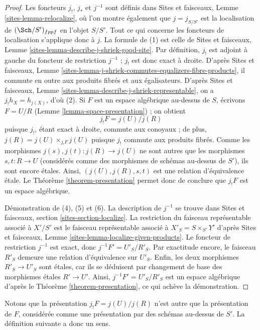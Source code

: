 \begin{proof}
Les foncteurs $j_!$, $j_*$ et $j^{-1}$ sont définis dans
Sites et faisceaux, Lemme \ref{sites-lemma-relocalize},
où l'on montre également que $j = j_{S/S'}$ est la localisation
de $(\Sch/S')_{fppf}$ en l'objet $S/S'$. Tout ce qui concerne
les foncteurs de localisation s'applique donc à $j$.
La formule de (1) est celle de
Sites et faisceaux, Lemme \ref{sites-lemma-describe-j-shriek-good-site}.
Par définition, $j_!$ est adjoint à gauche du foncteur de restriction $j^{-1}$ ;
$j_!$ est donc exact à droite. D'après
Sites et faisceaux, Lemme \ref{sites-lemma-j-shriek-commutes-equalizers-fibre-products},
il commute en outre aux produits fibrés et aux égalisateurs.
D'après
Sites et faisceaux, Lemme \ref{sites-lemma-describe-j-shriek-representable},
on a $j_!h_X = h_{j(X)}$, d'où (2).
Si $F$ est un espace algébrique au-dessus de $S$, écrivons $F = U/R$
(Lemme \ref{lemma-space-presentation}) ;
on obtient
$$
j_!F = j(U)/j(R)
$$
puisque $j_!$, étant exact à droite, commute aux conoyaux ; de plus,
$j(R) = j(U) \times_{j_!F} j(U)$ puisque $j_!$ commute aux produits fibrés.
Comme les morphismes $j(s), j(t) : j(R) \to j(U)$ ne sont autres que les morphismes
$s, t : R \to U$ (considérés comme des morphismes de schémas au-dessus de $S'$), ils
sont encore \'etales. Ainsi, $(j(U), j(R), s, t)$ est une relation d'équivalence \'etale.
Le
Théorème \ref{theorem-presentation}
permet donc de conclure que $j_!F$ est un espace algébrique.

\medskip\noindent
Démonstration de (4), (5) et (6). La description de $j^{-1}$ se trouve dans
Sites et faisceaux, section \ref{sites-section-localize}.
La restriction du faisceau représentable associé à $X'/S'$
est le faisceau représentable associé à
$X'_S = S \times_{S'} Y'$ d'après
Sites et faisceaux, Lemme \ref{sites-lemma-localize-given-products}.
Le foncteur de restriction $j^{-1}$ est exact, donc $j^{-1}F' = U'_S/R'_S$.
Par exactitude encore, le faisceau $R'_S$ demeure une relation d'équivalence sur
$U'_S$. Enfin, les deux morphismes $R'_S \to U'_S$ sont \'etales, car ils se
déduisent par changement de base des morphismes \'etales $R' \to U'$. Ainsi,
$j^{-1}F' = U'_S/R'_S$ est un espace algébrique d'après le
Théorème \ref{theorem-presentation},
ce qui achève la démonstration.
\end{proof}

\noindent
Notons que la présentation $j_!F = j(U)/j(R)$ n'est autre que la présentation
de $F$, considérée comme une présentation par des schémas au-dessus de $S'$.
La définition suivante a donc un sens.

